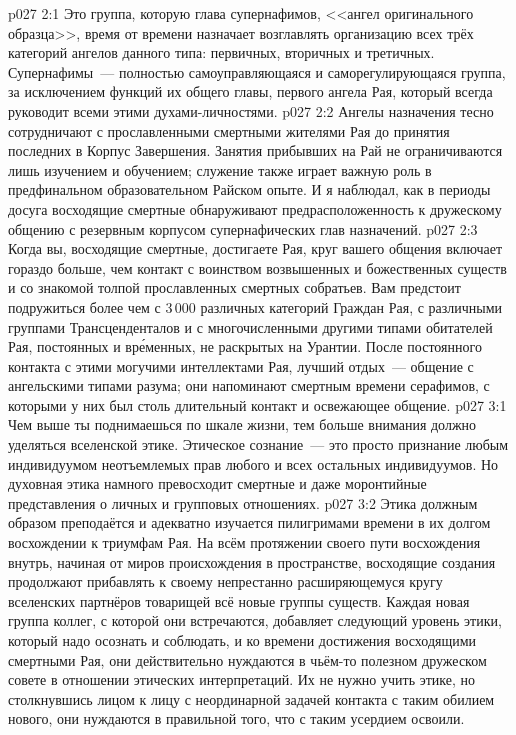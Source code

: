 \vs p027 2:1 Это группа, которую глава супернафимов, <<ангел оригинального образца>>, время от времени назначает возглавлять организацию всех трёх категорий ангелов данного типа: первичных, вторичных и третичных. Супернафимы~--- полностью самоуправляющаяся и саморегулирующаяся группа, за исключением функций их общего главы, первого ангела Рая, который всегда руководит всеми этими духами\hyp{}личностями.
\vs p027 2:2 Ангелы назначения тесно сотрудничают с прославленными смертными жителями Рая до принятия последних в Корпус Завершения. Занятия прибывших на Рай не ограничиваются лишь изучением и обучением; служение также играет важную роль в предфинальном образовательном Райском опыте. И я наблюдал, как в периоды досуга восходящие смертные обнаруживают предрасположенность к дружескому общению с резервным корпусом супернафических глав назначений.
\vs p027 2:3 Когда вы, восходящие смертные, достигаете Рая, круг вашего общения включает гораздо больше, чем контакт с воинством возвышенных и божественных существ и со знакомой толпой прославленных смертных собратьев. Вам предстоит подружиться более чем с 3\,000 различных категорий Граждан Рая, с различными группами Трансценденталов и с многочисленными другими типами обитателей Рая, постоянных и вр\'еменных, не раскрытых на Урантии. После постоянного контакта с этими могучими интеллектами Рая, лучший отдых~--- общение с ангельскими типами разума; они напоминают смертным времени серафимов, с которыми у них был столь длительный контакт и освежающее общение.
\vs p027 3:1 Чем выше ты поднимаешься по шкале жизни, тем больше внимания должно уделяться вселенской этике. Этическое сознание~--- это просто признание любым индивидуумом неотъемлемых прав любого и всех остальных индивидуумов. Но духовная этика намного превосходит смертные и даже моронтийные представления о личных и групповых отношениях.
\vs p027 3:2 Этика должным образом преподаётся и адекватно изучается пилигримами времени в их долгом восхождении к триумфам Рая. На всём протяжении своего пути восхождения внутрь, начиная от миров происхождения в пространстве, восходящие создания продолжают прибавлять к своему непрестанно расширяющемуся кругу вселенских партнёров товарищей всё новые группы существ. Каждая новая группа коллег, с которой они встречаются, добавляет следующий уровень этики, который надо осознать и соблюдать, и ко времени достижения восходящими смертными Рая, они действительно нуждаются в чьём\hyp{}то полезном дружеском совете в отношении этических интерпретаций. Их не нужно учить этике, но столкнувшись лицом к лицу с неординарной задачей контакта с таким обилием нового, они нуждаются в правильной  того, что с таким усердием освоили.

